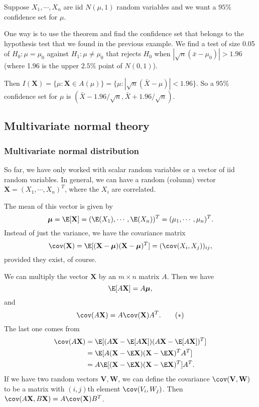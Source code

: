 \documentclass[a4paper]{article}
\begin{document}
\begin{eg}
  Suppose $X_1, \cdots, X_n$ are iid $N(\mu, 1)$ random variables and we want a $95\%$ confidence set for $\mu$.

  One way is to use the theorem and find the confidence set that belongs to the hypothesis test that we found in the previous example. We find a test of size 0.05 of $H_0 : \mu= \mu_0$ against $H_1: \mu\not= \mu_0$ that rejects $H_0$ when $|\sqrt{n}(\bar x - \mu_0)| > 1.96$ (where 1.96 is the upper $2.5\%$ point of $N(0, 1)$).

  Then $I(\mathbf{X}) = \{\mu: \mathbf{X}\in A(\mu)\} = \{\mu:|\sqrt{n}(\bar X - \mu)| < 1.96\}$. So a $95\%$ confidence set for $\mu$ is $(\bar X - 1.96/\sqrt{n}, \bar X + 1.96/\sqrt{n})$.
\end{eg}
\subsection{Multivariate normal theory}
\subsubsection{Multivariate normal distribution}
So far, we have only worked with scalar random variables or a vector of iid random variables. In general, we can have a random (column) vector $\mathbf{X} = (X_1, \cdots, X_n)^T$, where the $X_i$ are correlated.

The mean of this vector is given by
\[
  \boldsymbol\mu = \E[\mathbf{X}] = (\E(X_1), \cdots, \E(X_n))^T = (\mu_1, \cdots, \mu_n)^T.
\]
Instead of just the variance, we have the covariance matrix
\[
  \cov (\mathbf{X}) = \E[(\mathbf{X} - \boldsymbol\mu)(\mathbf{X} - \boldsymbol\mu)^T] = (\cov(X_i, X_j))_{ij},
\]
provided they exist, of course.

We can multiply the vector $\mathbf{X}$ by an $m\times n$ matrix $A$. Then we have
\[
  \E[A\mathbf{X}] = A\boldsymbol\mu,
\]
and
\[
  \cov (A\mathbf{X}) = A\cov(\mathbf{X})A^T.\tag{$*$}
\]
The last one comes from
\begin{align*}
  \cov(A\mathbf{X}) &= \E[(A\mathbf{X} -\E[A\mathbf{X}])(A\mathbf{X} - \E[A\mathbf{X}])^T] \\
  &= \E[A(\mathbf{X} - \E\mathbf{X})(\mathbf{X} - \E\mathbf{X})^T A^T]\\
  &= A\E[(\mathbf{X} - \E\mathbf{X})(\mathbf{X} - \E\mathbf{X})^T]A^T.
\end{align*}
If we have two random vectors $\mathbf{V}, \mathbf{W}$, we can define the covariance $\cov(\mathbf{V}, \mathbf{W})$ to be a matrix with $(i, j)$th element $\cov(V_i, W_j)$. Then $\cov(A\mathbf{X}, B\mathbf{X}) = A\cov (\mathbf{X}) B^T$.
\end{document}
